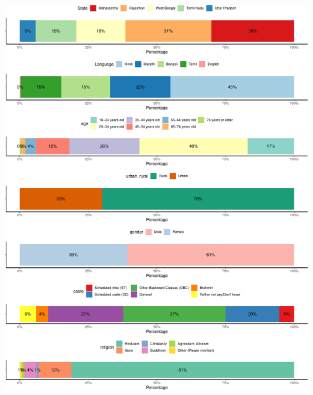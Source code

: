 \documentclass[
]{article}
\begin{document}
\includegraphics[width=0.8\linewidth,height=0.8\textheight]{Paper1_files/figure-latex/unnamed-chunk-32-1}
\end{document}
